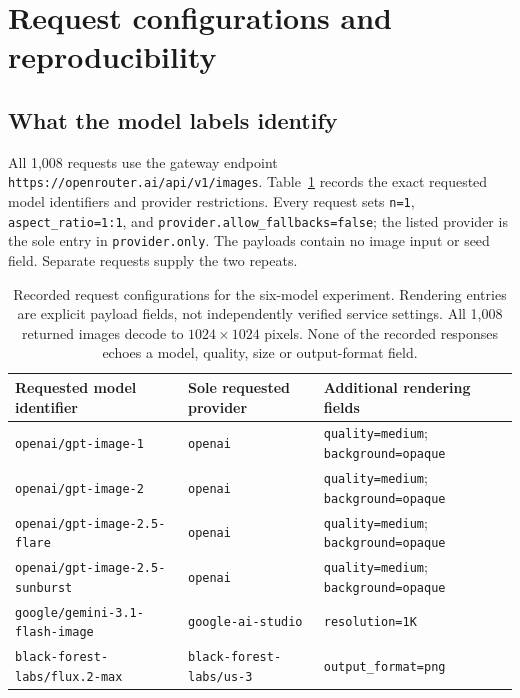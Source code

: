 \section{Request configurations and reproducibility}
\label{app:icml-reproducibility}

\subsection{What the model labels identify}
All 1,008 requests use the gateway endpoint
\nolinkurl{https://openrouter.ai/api/v1/images}.
Table~\ref{tab:icml-request-configurations} records the exact requested model
identifiers and provider restrictions. Every request sets
\texttt{n=1}, \texttt{aspect\_ratio=1:1}, and
\texttt{provider.allow\_fallbacks=false}; the listed provider is the sole
entry in \texttt{provider.only}. The payloads contain no image input or seed
field. Separate requests supply the two repeats.

\begin{table}[t]
\caption{Recorded request configurations for the six-model experiment.
Rendering entries are explicit payload fields, not independently verified
service settings. All 1,008 returned images decode to $1024\times1024$ pixels.
None of the recorded responses echoes a model, quality, size or output-format
field.}
\label{tab:icml-request-configurations}
\centering\small
\setlength{\tabcolsep}{5pt}
\begin{tabularx}{\textwidth}{@{}>{\raggedright\arraybackslash}p{}>{\raggedright\arraybackslash}p{}>{\raggedright\arraybackslash}X@{}}
\toprule
Requested model identifier & Sole requested provider & Additional rendering fields\\
\midrule
\nolinkurl{openai/gpt-image-1} & \texttt{openai} & \texttt{quality=medium}; \texttt{background=opaque}\\[3pt]
\nolinkurl{openai/gpt-image-2} & \texttt{openai} & \texttt{quality=medium}; \texttt{background=opaque}\\[3pt]
\nolinkurl{openai/gpt-image-2.5-flare} & \texttt{openai} & \texttt{quality=medium}; \texttt{background=opaque}\\[3pt]
\nolinkurl{openai/gpt-image-2.5-sunburst} & \texttt{openai} & \texttt{quality=medium}; \texttt{background=opaque}\\[3pt]
\nolinkurl{google/gemini-3.1-flash-image} & \texttt{google-ai-studio} & \texttt{resolution=1K}\\[3pt]
\nolinkurl{black-forest-labs/flux.2-max} & \nolinkurl{black-forest-labs/us-3} & \texttt{output\_format=png}\\
\bottomrule
\end{tabularx}
\end{table}

